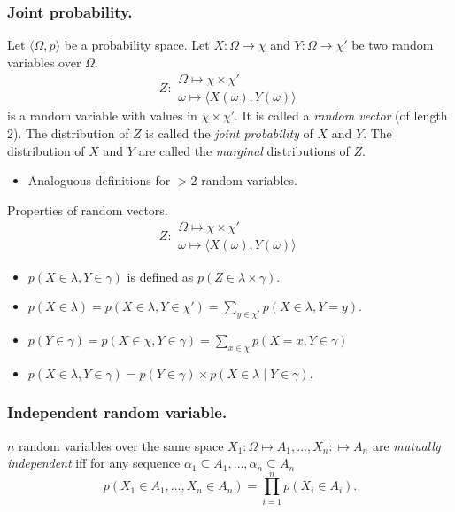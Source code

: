 \documentclass{beamer}
\begin{document}
\begin{frame}
  \frametitle{Joint probability.}
  Let $\langle \Omega, p \rangle$ be a probability space. Let $X: \Omega \rightarrow \chi$ and $Y: \Omega \rightarrow \chi'$ be two random variables over $\Omega$.
  \[Z: \begin{array}{l} \Omega \mapsto \chi \times \chi'\\\omega \mapsto \langle X(\omega), Y(\omega) \rangle \end{array}\] is a random variable with values in $\chi \times \chi'$. It is called a \emph{random vector} (of length $2$). The distribution of $Z$ is called the \emph{joint probability} of $X$ and $Y$. The distribution of $X$ and $Y$ are called the \emph{marginal} distributions of $Z$.

  \begin{itemize}
  \item Analoguous definitions for $ > 2$ random variables.
  \end{itemize}
\end{frame}

\begin{frame}{Properties of random vectors.}
  \[Z: \begin{array}{l} \Omega \mapsto \chi \times \chi'\\\omega \mapsto \langle X(\omega), Y(\omega) \rangle \end{array}\]
  \begin{itemize}
  \item $p(X \in \lambda, Y \in \gamma)$ is defined as $p(Z \in \lambda \times \gamma)$.
  \item $p(X \in \lambda) = p(X \in \lambda, Y \in \chi') = \sum_{y \in \chi'} p(X \in \lambda, Y = y)$.
  \item $p(Y \in \gamma) = p(X \in \chi, Y \in \gamma) = \sum_{x \in \chi} p(X=x, Y \in \gamma)$
  \item $p(X \in \lambda, Y \in \gamma) = p(Y \in \gamma) \times p(X \in \lambda \mid Y \in \gamma)$.
  \end{itemize}
  
\end{frame}

\begin{frame}\frametitle{Independent random variable.}
  $n$ random variables over the same space $X_1 : \Omega \mapsto A_1, \dots, X_n: \mapsto A_n$ are \emph{mutually independent} iff for any sequence $\alpha_1 \subseteq A_1, \dots, \alpha_n \subseteq A_n$
  \[ p(X_1 \in A_1,\dots, X_n \in A_n) = \prod^n_{i=1}p(X_i \in A_i).\]
\end{frame}
\end{document}
